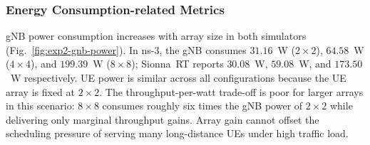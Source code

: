 \subsubsection{Energy Consumption-related Metrics}
\label{subsubsec:exp2-free-space-energy}

gNB power consumption increases with array size in both simulators (Fig.~\ref{fig:exp2-gnb-power}).
In ns-3, the gNB consumes $31.16$~W ($2\times2$), $64.58$~W ($4\times4$), and $199.39$~W ($8\times8$); Sionna~RT reports $30.08$~W, $59.08$~W, and $173.50$~W respectively.
UE power is similar across all configurations because the UE array is fixed at $2\times2$.
The throughput-per-watt trade-off is poor for larger arrays in this scenario: $8\times8$ consumes roughly six times the gNB power of $2\times2$ while delivering only marginal throughput gains.
Array gain cannot offset the scheduling pressure of serving many long-distance UEs under high traffic load.
